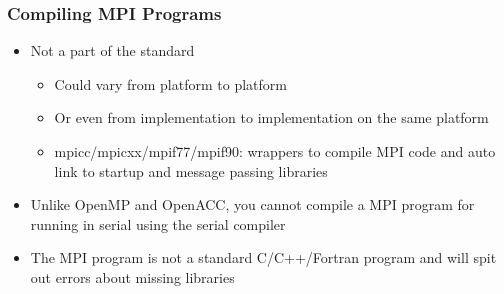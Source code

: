 \documentclass[9pt,c]{beamer}
\begin{document}
\begin{frame}
  \frametitle{Compiling MPI Programs}
  \begin{itemize}
    \item Not a part of the standard
      \begin{itemize}
        \item Could vary from platform to platform
        \item Or even from implementation to implementation on the same  platform
        \item mpicc/mpicxx/mpif77/mpif90: wrappers to compile MPI code and auto 
          link to startup and message passing libraries 
      \end{itemize}
    \item<2> \alert<2>{Unlike OpenMP and OpenACC, you cannot compile a MPI program 
      for running in serial using the serial compiler}
    \item<2> \alert<2>{The MPI program is not a standard C/C++/Fortran program and 
      will spit out errors about missing libraries} 
  \end{itemize}
\end{frame}
\end{document}

